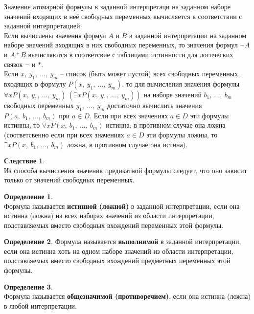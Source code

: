\documentclass[a4paper,12pt]{article}
\theoremstyle{definition} %
\newtheorem{definition}{Определение}[section]
\newtheorem{corollary}{Следствие}[section]
\theoremstyle{definition} %
\theoremstyle{remark} %
\begin{document}
	Значение атомарной формулы в заданной интерпретаци на заданном наборе значений входящих в неё свободных переменных вычисляется в соответствии с заданной интерпретацией.\\[1ex]
	Если вычислены значения формул $A$ и $B$ в заданной интерпретации на заданном наборе значений входящих в них свободных переменных, то значения формул $\neg A$ и $A * B$ вычисляются в соответсвие с таблицами истинности для логических связок $\neg$ и $*$.\\[1ex]
	Если $x, \ y_1, \ \dots , \ y_m$ -- список (быть может пустой) всех свободных переменных, входящих  в формулу $P(x, \ y_1, \ \dots , \ y_m)$, то для вычисления значения формулы $\forall x P(x, \ y_1, \ \dots , \ y_m) \ (\exists x P(x, \ y_1, \ \dots , \ y_m))$ на наборе значений $b_1, \ \dots , \ b_m$ свободных переменных $y_1, \ \dots , \ y_m$ достаточно вычислить значения $P(a, \ b_1 , \ \dots , \ b_m) \text{ при } a \in D$. Если при всех значениях $a \in D$ эти формулы истинны, то $\forall x P(x, \ b_1 , \ \dots , \ b_m)$ истинна, в противном случае она ложна (соответсвенно если при всех значениях $a \in D$ эти формулы ложны, то $\exists x P(x, \ b_1 , \ \dots , \ b_m)$ ложна, в противном случае она истнна).
	
	\begin{corollary}\ \\[1ex]
		Из способа вычисления значения предикатной формулы следует, что оно зависит только от значений свободных переменных.
	\end{corollary}

	\begin{definition}\ \\[1ex]
		Формула называется \textbf{истинной (ложной)} в заданной интерпретации, если она истинна (ложна) на всех наборах значений из области интерпретации, подставляемых вместо свободных вхождений переменных этой формулы.
	\end{definition}

	\begin{definition}
		Формула называется \textbf{выполнимой} в заданной интерпретации, если она истинна хоть на одном наборе значений из области интерпретации, подставляемых вместо свободных вхождений предметных переменных этой формулы.
	\end{definition}

	\begin{definition}\ \\[1ex]
		Формула называется \textbf{общезначимой (противоречием)}, если она истинна (ложна) в любой интерпретации.
	\end{definition}
\end{document}
